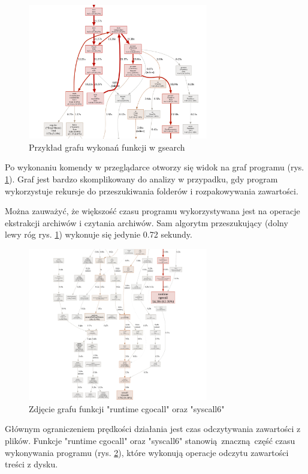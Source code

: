 \begin{figure}[h]
\centering
\includegraphics[width=0.7\textwidth]{./images/profiler1.png}
\caption{Przykład grafu wykonań funkcji w gsearch}
\label{fig:profilerGsearch1}
\end{figure}

Po wykonaniu komendy w przeglądarce otworzy się widok na graf programu (rys. \ref{fig:profilerGsearch1}).
Graf jest bardzo skomplikowany do analizy w przypadku, gdy program wykorzystuje rekursje do
przeszukiwania folderów i rozpakowywania zawartości.

Można zauważyć, że większość czasu programu wykorzystywana jest na operacje 
ekstrakcji archiwów i czytania archiwów. Sam algorytm przeszukujący (dolny lewy 
róg rys. \ref{fig:profilerGsearch1}) wykonuje się jedynie 0.72 sekundy.

\begin{figure}[h]
\centering
\includegraphics[width=0.7\textwidth]{./images/profiler2.png}
\caption{Zdjęcie grafu funkcji "runtime cgocall" oraz "syscall6"}
\label{fig:profilerGsearch2}
\end{figure}

Głównym ograniczeniem prędkości działania jest czas odczytywania zawartości z plików.
Funkcje "runtime cgocall" oraz "syscall6" stanowią znaczną część czasu
wykonywania programu (rys. \ref{fig:profilerGsearch2}), które wykonują operacje
odczytu zawartości treści z dysku.